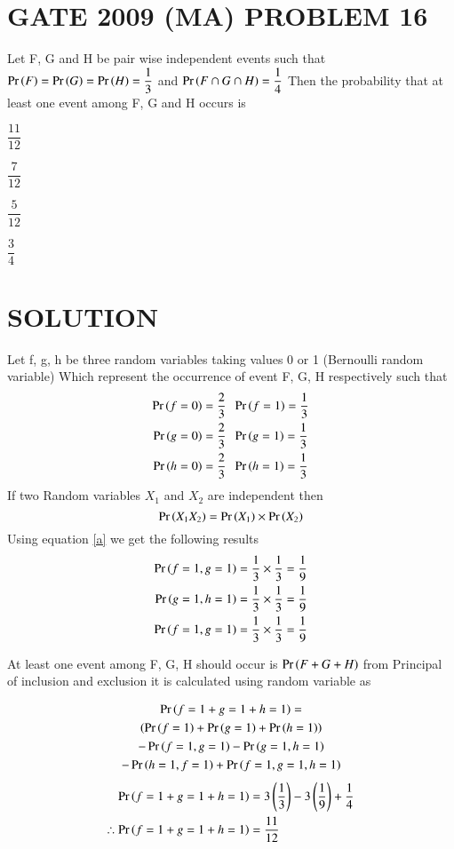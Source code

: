 \documentclass[journal,12pt,twocolumn]{IEEEtran}
\begin{document}
\section{GATE 2009 (MA) PROBLEM 16} 
Let F, G and H be pair wise independent events such that $\Pr\left(F\right)=\Pr\left(G\right)=\Pr\left(H\right)=\dfrac{1}{3}$ 
and $\Pr\left(F \cap G \cap H\right)=\dfrac{1}{4}$ Then the probability that at least one event among F, G and H occurs is 
\begin{enumerate}[(A)]
\begin{multicols}{4}
\setlength\itemsep{2em}
\item $\dfrac{11}{12}$
\item $\dfrac{7}{12}$
\item $\dfrac{5}{12}$
\item $\dfrac{3}{4}$
\end{multicols}
\end{enumerate}

\section{SOLUTION}
Let f, g, h be three random variables taking values 0 or 1 (Bernoulli random variable) Which 
represent the occurrence of event F, G, H respectively such that 
\begin{align}
\Pr\left(f=0\right) = \dfrac{2}{3}\;&\;\Pr\left(f=1\right) = \dfrac{1}{3} \\
\Pr\left(g=0\right) = \dfrac{2}{3}\;&\;\Pr\left(g=1\right) = \dfrac{1}{3} \\
\Pr\left(h=0\right) = \dfrac{2}{3}\;&\;\Pr\left(h=1\right) = \dfrac{1}{3} \\
\end{align}
If two Random variables $X_1$ and $X_2$ are independent then 
\begin{equation}
\Pr\left(X_1 X_2\right) = \Pr\left(X_1\right) \times \Pr\left(X_2\right) \label{a}
\end{equation}
Using equation \eqref{a} we get the following results 
\begin{align}
\Pr\left(f=1,g=1\right) &= \dfrac{1}{3} \times \dfrac{1}{3} = \dfrac{1}{9} \\
\Pr\left(g=1,h=1\right) &= \dfrac{1}{3} \times \dfrac{1}{3} = \dfrac{1}{9} \\
\Pr\left(f=1,g=1\right) &= \dfrac{1}{3} \times \dfrac{1}{3} = \dfrac{1}{9} 
\end{align}

At least one event among F, G, H should occur is $\Pr\left(F + G + H\right)$ 
from Principal of inclusion and exclusion it is calculated using random variable as

\begin{multline}
\Pr\left(f=1 + g=1 + h=1\right) =  \\
\left(\Pr\left(f=1\right) + \Pr\left(g=1\right) + \Pr\left(h=1\right)\right) \\
- \Pr\left(f=1,g=1\right) - \Pr\left(g=1,h=1\right) \\
 - \Pr\left(h=1,f=1\right) + \Pr\left(f=1,g=1,h=1\right)
\end{multline}
\begin{align*}
\Pr\left(f=1 + g=1 + h=1\right) &= 3\left(\dfrac{1}{3}\right) - 3\left(\dfrac{1}{9}\right) + \dfrac{1}{4} \\
\therefore \Pr\left(f=1 + g=1 + h=1\right) &= \dfrac{11}{12}
\end{align*}
\end{document}
